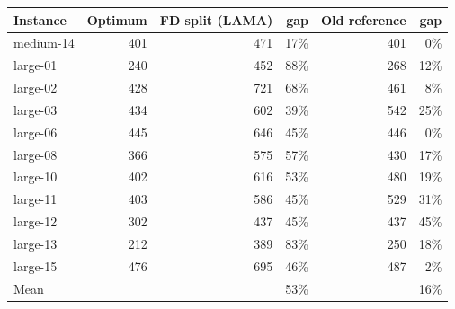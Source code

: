 \begin{tabular}{lrrrrr}
\toprule
Instance & Optimum & FD split (LAMA) & gap & Old reference & gap \\
\midrule
medium-14 & 401 & 471 & 17\% & 401 & 0\% \\
large-01 & 240 & 452 & 88\% & 268 & 12\% \\
large-02 & 428 & 721 & 68\% & 461 & 8\% \\
large-03 & 434 & 602 & 39\% & 542 & 25\% \\
large-06 & 445 & 646 & 45\% & 446 & 0\% \\
large-08 & 366 & 575 & 57\% & 430 & 17\% \\
large-10 & 402 & 616 & 53\% & 480 & 19\% \\
large-11 & 403 & 586 & 45\% & 529 & 31\% \\
large-12 & 302 & 437 & 45\% & 437 & 45\% \\
large-13 & 212 & 389 & 83\% & 250 & 18\% \\
large-15 & 476 & 695 & 46\% & 487 & 2\% \\
\midrule
Mean & & & 53\% & & 16\% \\
\bottomrule
\end{tabular}
